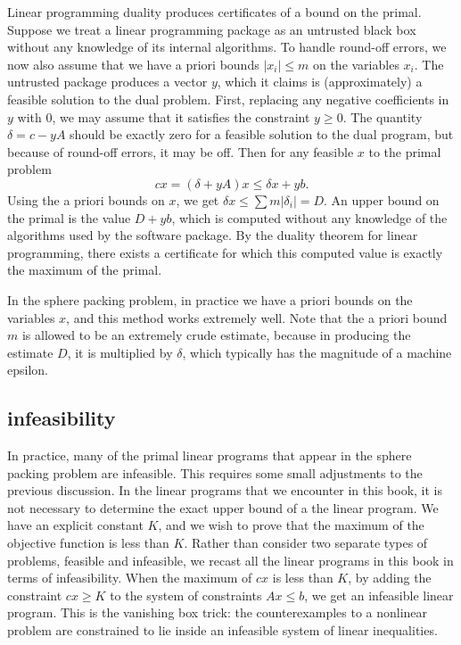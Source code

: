Linear programming duality produces certificates of a bound
on the primal.  Suppose we treat a linear programming package as
an untrusted 
black box without any knowledge of its internal algorithms.
To handle round-off errors, we now also assume that we have
a priori bounds $|x_i| \le m$ on the variables $x_i$.
The untrusted package produces a vector $y$, which it claims
is (approximately) a feasible solution to the dual problem.  
First, replacing
any negative coefficients in $y$ with $0$, we may assume that
it satisfies the constraint $y\ge 0$.  The quantity $\delta = c - y A$
should be exactly zero for a feasible solution to the dual program, but
because of round-off errors, it may be  off.  
Then for any feasible $x$ to the primal problem
   $$
   c x = (\delta + y A)  x \le \delta  x + y b.
   $$
Using the a priori bounds on $x$, we get $\delta x\le \sum 
m|\delta_i|=D$.  An upper bound on the primal is the value
$D + y b$, which is computed without any knowledge of the
algorithms used by the software package.  By the duality theorem
for linear programming, there exists a certificate for which this
computed value is exactly the maximum of the primal.

In the sphere packing problem, in practice we have a priori bounds
on the variables $x$, and this method works extremely well.  Note
that the a priori bound $m$ is allowed to be an extremely crude estimate,
because in producing the estimate $D$, it is multiplied by $\delta$,
which typically has the magnitude of a machine epsilon.

\subsection{infeasibility}


In practice, many of the primal linear programs that appear
in the sphere packing problem are infeasible.  This requires
some small adjustments to the previous discussion.   In the
linear programs that we encounter in this book, it is not
necessary to determine the exact upper bound of a the linear program.
We have an explicit constant $K$, and we wish to prove that
the maximum of the objective function is less than $K$.
Rather
than consider two separate
types of problems, feasible and infeasible, we recast all the linear
programs in this book in terms of infeasibility.
When the maximum of $c x$ is less than $K$, by
adding the constraint $c x\ge K$ to the system of constraints
$A x\le b$,  we get an infeasible linear program.
This is the vanishing box trick:  the counterexamples to a nonlinear
problem are constrained to lie inside an infeasible system of linear
inequalities.


